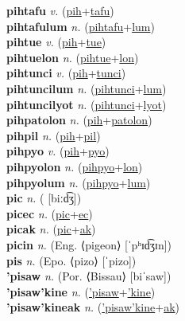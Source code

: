 \textbf{pihtafu} \textit{v.} (\hyperref[pih]{pih}+\hyperref[tafu]{tafu})
 \label{pihtafu} \\
\textbf{pihtafulum} \textit{n.} (\hyperref[pihtafu]{pihtafu}+\hyperref[lum]{lum})
 \label{pihtafulum} \\
\textbf{pihtue} \textit{v.} (\hyperref[pih]{pih}+\hyperref[tue]{tue})
 \label{pihtue} \\
\textbf{pihtuelon} \textit{n.} (\hyperref[pihtue]{pihtue}+\hyperref[lon]{lon})
 \label{pihtuelon} \\
\textbf{pihtunci} \textit{v.} (\hyperref[pih]{pih}+\hyperref[tunci]{tunci})
 \label{pihtunci} \\
\textbf{pihtuncilum} \textit{n.} (\hyperref[pihtunci]{pihtunci}+\hyperref[lum]{lum})
 \label{pihtuncilum} \\
\textbf{pihtuncilyot} \textit{n.} (\hyperref[pihtunci]{pihtunci}+\hyperref[lyot]{lyot})
 \label{pihtuncilyot} \\
\textbf{pihpatolon} \textit{n.} (\hyperref[pih]{pih}+\hyperref[patolon]{patolon})
 \label{pihpatolon} \\
\textbf{pihpil} \textit{n.} (\hyperref[pih]{pih}+\hyperref[pil]{pil})
 \label{pihpil} \\
\textbf{pihpyo} \textit{v.} (\hyperref[pih]{pih}+\hyperref[pyo]{pyo})
 \label{pihpyo} \\
\textbf{pihpyolon} \textit{n.} (\hyperref[pihpyo]{pihpyo}+\hyperref[lon]{lon})
 \label{pihpyolon} \\
\textbf{pihpyolum} \textit{n.} (\hyperref[pihpyo]{pihpyo}+\hyperref[lum]{lum})
 \label{pihpyolum} \\
\textbf{pic} \textit{n.} ( [biːd͡ʒ])
 \label{pic} \\
\textbf{picec} \textit{n.} (\hyperref[pic]{pic}+\hyperref[ec]{ec})
 \label{picec} \\
\textbf{picak} \textit{n.} (\hyperref[pic]{pic}+\hyperref[ak]{ak})
 \label{picak} \\
\textbf{picin} \textit{n.} (Eng. ⟨pigeon⟩ [ˈpʰɪd͡ʒɪn])
 \label{picin} \\
\textbf{pis} \textit{n.} (Epo. ⟨pizo⟩ [ˈpizo])
 \label{pis} \\
\textbf{'pisaw} \textit{n.} (Por. ⟨Bissau⟩ [biˈsaw])
 \label{'pisaw} \\
\textbf{'pisaw'kine} \textit{n.} (\hyperref['pisaw]{'pisaw}+\hyperref['kine]{'kine})
 \label{'pisaw'kine} \\
\textbf{'pisaw'kineak} \textit{n.} (\hyperref['pisaw'kine]{'pisaw'kine}+\hyperref[ak]{ak})
 \label{'pisaw'kineak} \\
